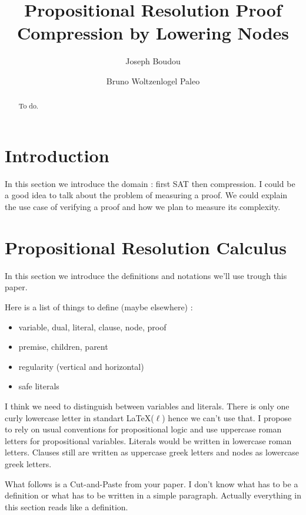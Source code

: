 \documentclass{llncs}
\title{Propositional Resolution Proof Compression by Lowering Nodes}
\author{Joseph Boudou \and Bruno Woltzenlogel Paleo}
\institute{Vienna University of Technology, Austria}
\newenvironment{jogo}{\color{teal}}{}
\begin{document}
\maketitle

\begin{abstract}
\begin{jogo}
  To do.
\end{jogo}
\end{abstract}

\section{Introduction}

\begin{jogo}
In this section we introduce the domain : first SAT then compression.
I could be a good idea to talk about the problem of measuring a proof.
We could explain the use case of verifying a proof and how we plan to measure its complexity.
\end{jogo}

\section{Propositional Resolution Calculus}

\begin{jogo}
In this section we introduce the definitions and notations we'll use trough this paper.

Here is a list of things to define (maybe elsewhere) : \begin{itemize}[nosep]
    \item variable, dual, literal, clause, node, proof
    \item premise, children, parent
    \item regularity (vertical and horizontal)
    \item safe literals
\end{itemize}
\end{jogo}

\begin{jogo}
I think we need to distinguish between variables and literals. There is only one curly lowercase
letter in standart \LaTeX ($\ell$) hence we can't use that. I propose to rely on usual conventions
for propositional logic and use uppercase roman letters for propositional variables. Literals would
be written in lowercase roman letters. Clauses still are written as uppercase greek letters and nodes
as lowercase greek letters.

What follows is a Cut-and-Paste from your paper. I don't know what has to be a definition or what
has to be written in a simple paragraph. Actually everything in this section reads like a
definition.
\end{jogo}
\end{document}
